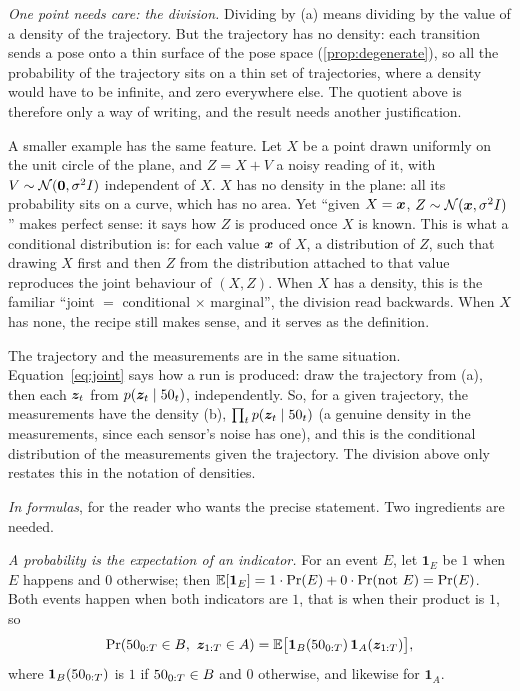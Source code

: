 \emph{One point needs care: the division.} Dividing by (a) means
dividing by the value of a density of the trajectory. But the trajectory
has no density: each transition sends a pose onto a thin surface of the
pose space (\cref{prop:degenerate}), so all the probability of the
trajectory sits on a thin set of trajectories, where a density would
have to be infinite, and zero everywhere else. The quotient above is
therefore only a way of writing, and the result needs another
justification.

A smaller example has the same feature. Let $X$ be a point drawn
uniformly on the unit circle of the plane, and $Z=X+V$ a noisy reading of
it, with $V\sim\mathcal{N}(\bm{0},\sigma^2I)$ independent of $X$. $X$ has no
density in the plane: all its probability sits on a curve, which has no
area. Yet ``given $X=\bm{x}$, $Z\sim\mathcal{N}(\bm{x},\sigma^2I)$'' makes
perfect sense: it says how $Z$ is produced once $X$ is known. This is
what a conditional distribution is: for each value $\bm{x}$ of $X$, a
distribution of $Z$, such that drawing $X$ first and then $Z$ from the
distribution attached to that value reproduces the joint behaviour of
$(X,Z)$. When $X$ has a density, this is the familiar ``joint $=$
conditional $\times$ marginal'', the division read backwards. When $X$
has none, the recipe still makes sense, and it serves as the definition.

The trajectory and the measurements are in the same situation.
Equation~\eqref{eq:joint} says how a run is produced: draw the
trajectory from (a), then each $\bm{z}_t$ from $p(\bm{z}_t\mid50_t)$,
independently. So, for a given trajectory, the measurements have the
density (b), $\prod_tp(\bm{z}_t\mid50_t)$ (a genuine density in the
measurements, since each sensor's noise has one), and this is the
conditional distribution of the measurements given the trajectory. The
division above only restates this in the notation of densities.

\emph{In formulas}, for the reader who wants the precise statement. Two
ingredients are needed.

\emph{A probability is the expectation of an indicator.} For an event
$E$, let $\mathbf 1_E$ be $1$ when $E$ happens and $0$ otherwise; then
$\mathbb{E}[\mathbf 1_E]=1\cdot\Pr(E)+0\cdot\Pr(\text{not }E)=\Pr(E)$. Both events
happen when both indicators are $1$, that is when their product is $1$, so
\[
  \Pr(50_{0:T}\in B,\ \bm{z}_{1:T}\in A)
  =\mathbb{E}\bigl[\mathbf 1_B(50_{0:T})\,\mathbf 1_A(\bm{z}_{1:T})\bigr],
\]
where $\mathbf 1_B(50_{0:T})$ is $1$ if $50_{0:T}\in B$ and $0$ otherwise,
and likewise for $\mathbf 1_A$.

